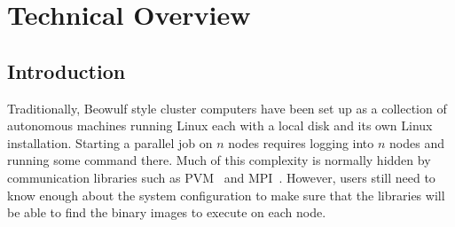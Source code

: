 \chapter{Technical Overview}






\section{Introduction}


Traditionally, Beowulf style cluster computers have been set up as a
collection of autonomous machines running Linux each with a local disk
and its own Linux installation.  Starting a parallel job on $n$ nodes
requires logging into $n$ nodes and running some command there.  Much
of this complexity is normally hidden by communication libraries such
as PVM~\cite{pvm} and MPI~\cite{mpi}.  However, users still need to
know enough about the system configuration to make sure that the
libraries will be able to find the binary images to execute on each
node.

